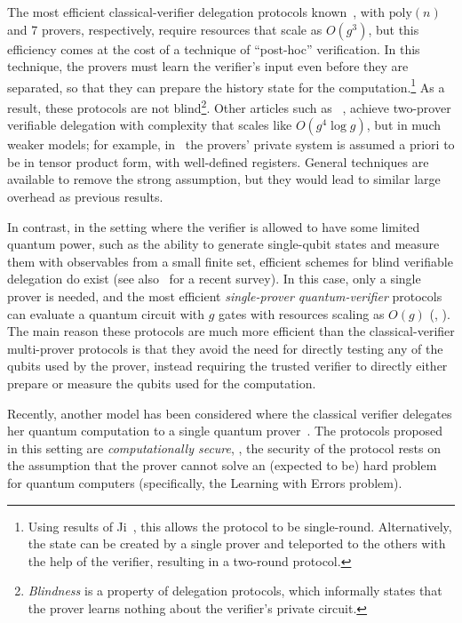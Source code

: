 \documentclass{toc}
\begin{document}
The most efficient classical-verifier delegation protocols 
%
known~\cite{hajdusek2015posthoc-updated, FHM18, %
natarajan2016robust}, 
with $\mathrm{poly}(n)$ and 7 provers, respectively,
require resources that scale as $O(g^3)$, 
but this efficiency comes at the cost of a technique of ``post-hoc''
verification. In this technique, the provers must learn the
verifier's input even before they are separated, so that they can prepare the
history state for the computation.\footnote{Using results of Ji~\cite{Ji16},
this allows the protocol to be single-round. Alternatively, the state can be created by a single prover and teleported to the others with the help of the verifier, resulting in a two-round protocol.} As a result, these protocols are not blind\footnote{
\emph{Blindness} is a property of delegation protocols, which informally states that the prover learns nothing about the verifier's private circuit.}. 
Other %
articles  %
such as ~\cite{HayashiH16},
achieve two-prover verifiable delegation with complexity that scales like $O(g^4\log g)$,  but in much weaker models; for example, in~\cite{HayashiH16} the provers' private system is assumed a priori to be in tensor product form, with well-defined registers.  General techniques are available to remove the strong assumption, but they would lead to similar large overhead as previous results.

In contrast, in the setting where the verifier is allowed to have some limited quantum power, such as the ability to generate single-qubit states and measure them with observables from a small finite set, efficient schemes for blind verifiable delegation do exist \cite{aharonov10qpip,fitzsimons12vubqc,Morimae14,broadbent15howtoverify,HayashiM15,%
MF16a,FHM18,  %
FujiiH17, MorimaeTH17}
(see also~\cite{fitzsimons2016survey} for a recent survey). In this case, only a single prover is needed, and the most efficient \emph{single-prover quantum-verifier} protocols can evaluate a quantum circuit with $g$ gates with resources scaling as $O(g)$ (\eg, \cite{broadbent15howtoverify}). The main reason these protocols are much more efficient than the classical-verifier multi-prover protocols is that they avoid the need for directly testing any of the qubits used by the prover, instead requiring the trusted verifier to directly either prepare or measure the qubits used for the computation. 


Recently, another model has been considered where the classical verifier delegates her quantum computation to a single quantum prover~\cite{mahadev2018,GheorghiuV19}. The protocols proposed in this setting are \emph{computationally secure}, \ie, the security of the protocol rests on the assumption that the prover cannot solve an (expected to be) hard problem for quantum computers (specifically, the Learning with Errors problem). 
\end{document}
